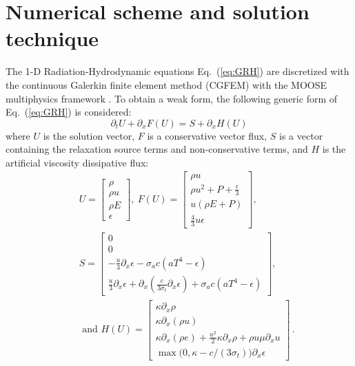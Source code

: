\documentclass[review]{elsarticle}
\newcommand{\eqt}[1]{Eq.~(\ref{#1})}                     %
\begin{document}
\section{Numerical scheme and solution technique}
\label{sec:num-scheme}

The 1-D Radiation-Hydrodynamic equations \eqt{eq:GRH} are discretized with the continuous Galerkin finite element method (CGFEM) with the MOOSE multiphysics framework \cite{Moose}. To obtain a weak form, the following generic form of \eqt{eq:GRH} is considered:
\begin{equation}
\label{eq:form}
\partial_t U + \partial_x F \left( U \right) = S + \partial_x H \left(U\right)
\end{equation}
where $U$ is the solution vector, $F$ is a conservative vector flux, $S$ is a vector containing the relaxation source terms and non-conservative terms, and $H$ is the artificial viscosity dissipative flux:
\begin{eqnarray*}
&&U = 
\begin{bmatrix}
\rho \\
\rho u \\
\rho E \\
\epsilon
\end{bmatrix}
,\
F(U) = 
\begin{bmatrix}
\rho u \\
\rho u^2 + P + \frac{\epsilon}{3} \\
u \left( \rho E + P \right) \\
\frac{4}{3} u \epsilon
\end{bmatrix}
,\ \\
&&S = 
\begin{bmatrix}
0 \\
0 \\
-\frac{u}{3} \partial_x \epsilon - \sigma_a c \left( a T^4 - \epsilon \right) \\
\frac{u}{3} \partial_x \epsilon + \partial_x \left( \frac{c}{3 \sigma_t} \partial_x \epsilon \right) + \sigma_a c \left( a T^4 - \epsilon \right)
\end{bmatrix}
,
\\
&&\text{ and } 
H(U) = 
\begin{bmatrix}
\kappa \partial_x \rho \\
\kappa \partial_x (\rho u) \\
\kappa \partial_x \left( \rho e \right) + \frac{u^2}{2} \kappa \partial_x \rho + \rho u \mu \partial_x u \\
\max \big( 0, \kappa- c/(3 \sigma_t) \big) \partial_x \epsilon 
\end{bmatrix} \,.
\end{eqnarray*}
\end{document}
